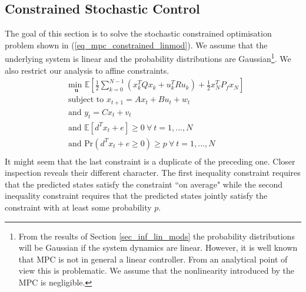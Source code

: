 \subsection{Constrained Stochastic Control}
The goal of this section is to solve the stochastic constrained optimisation problem shown in (\ref{eq_mpc_constrained_linmod}). We assume that the underlying system is linear and the probability distributions are Gaussian\footnote{From the results of Section \ref{sec_inf_lin_mods} the probability distributions will be Gaussian if the system dynamics are linear. However, it is well known \cite{mac} that MPC is not in general a linear controller. From an analytical point of view this is problematic. We assume that the nonlinearity introduced by the MPC is negligible.}. We also restrict our analysis to affine constraints.
\begin{equation}
\begin{aligned}
&\underset{\mathbf{u}}{\text{min }} \mathbb{E}\left[ \frac{1}{2}\sum_{k=0}^{N-1} \left( x_k^TQx_k + u_k^TRu_k \right) + \frac{1}{2}x_N^TP_fx_N \right] \\
& \text{subject to } x_{t+1}=Ax_t+Bu_t + w_t \\
& \text{and } y_{t}= Cx_t + v_t \\
& \text{and } \mathbb{E}[d^Tx_t + e] \geq 0 ~\forall ~t=1,...,N \\
& \text{and } \text{Pr}(d^Tx_t + e \geq 0) \geq p ~\forall ~t=1,...,N\\
\end{aligned}
\label{eq_mpc_constrained_linmod}
\end{equation}
It might seem that the last constraint is a duplicate of the preceding one. Closer inspection reveals their different character. The first inequality constraint requires that the predicted states satisfy the constraint ``on average" while the second inequality constraint requires that the predicted states jointly satisfy the constraint with at least some probability $p$.

